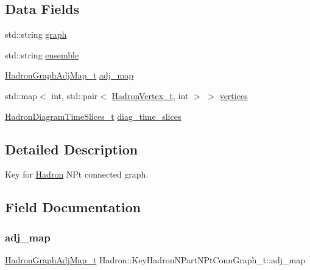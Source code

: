 \subsection*{Data Fields}
\begin{DoxyCompactItemize}
\item 
std\+::string \mbox{\hyperlink{structHadron_1_1KeyHadronNPartNPtConnGraph__t_a996ccfc63af40b62e92f0b5aa524f35f}{graph}}
\item 
std\+::string \mbox{\hyperlink{structHadron_1_1KeyHadronNPartNPtConnGraph__t_a37d804ea938f4c033935d613ab9e6903}{ensemble}}
\item 
\mbox{\hyperlink{namespaceHadron_ad6387ffed6a1bf53021dce29b71d3a04}{Hadron\+Graph\+Adj\+Map\+\_\+t}} \mbox{\hyperlink{structHadron_1_1KeyHadronNPartNPtConnGraph__t_a31f0e74c9bf15adc5237e4d6e6d1d5b2}{adj\+\_\+map}}
\item 
std\+::map$<$ int, std\+::pair$<$ \mbox{\hyperlink{structHadron_1_1HadronVertex__t}{Hadron\+Vertex\+\_\+t}}, int $>$ $>$ \mbox{\hyperlink{structHadron_1_1KeyHadronNPartNPtConnGraph__t_a1d4b8dbca7194352d4fdfe003619d553}{vertices}}
\item 
\mbox{\hyperlink{structHadron_1_1HadronDiagramTimeSlices__t}{Hadron\+Diagram\+Time\+Slices\+\_\+t}} \mbox{\hyperlink{structHadron_1_1KeyHadronNPartNPtConnGraph__t_a08990a62dd1b8de9fb98465fe5513e71}{diag\+\_\+time\+\_\+slices}}
\end{DoxyCompactItemize}


\subsection{Detailed Description}
Key for \mbox{\hyperlink{namespaceHadron}{Hadron}} N\+Pt connected graph. 

\subsection{Field Documentation}
\mbox{\label{structHadron_1_1KeyHadronNPartNPtConnGraph__t_a31f0e74c9bf15adc5237e4d6e6d1d5b2}} 
\subsubsection{\texorpdfstring{adj\_map}{adj\_map}}
{\footnotesize\ttfamily \mbox{\hyperlink{namespaceHadron_ad6387ffed6a1bf53021dce29b71d3a04}{Hadron\+Graph\+Adj\+Map\+\_\+t}} Hadron\+::\+Key\+Hadron\+N\+Part\+N\+Pt\+Conn\+Graph\+\_\+t\+::adj\+\_\+map}

